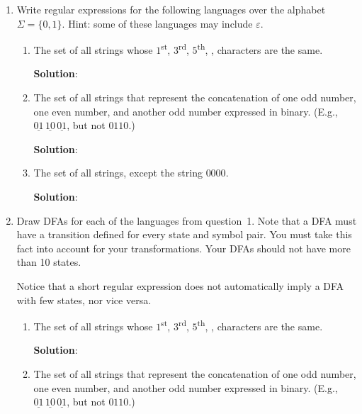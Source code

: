 \documentclass[11pt]{article}
\renewcommand{\epsilon}{\varepsilon}
\begin{document}
\begin{enumerate}
\item Write regular expressions for the following languages over the alphabet $\Sigma = \{0, 1\}$.  Hint: some of these languages may include $\epsilon$.
\begin{enumerate}
    \item The set of all strings whose $1$\textsuperscript{st}, $3$\textsuperscript{rd}, $5$\textsuperscript{th}, \textellipsis, characters are the same.

    \textbf{Solution}:
    \[
    \]

    \item The set of all strings that represent the concatenation of one odd number, one even number, and another odd number expressed in binary. (E.g., $\underline{01}\,\underline{10}\,\underline{01}$, but not $0110$.)

    \textbf{Solution}:
    \[
    \]

    \item The set of all strings, except the string $0000$.

    \textbf{Solution}:
    \[
    \]
\end{enumerate}

\newpage

\item Draw DFAs for each of the languages from question~1. Note that a DFA must have a transition defined for every state and symbol pair. You must take this fact into account for your transformations. Your DFAs should not have more than 10 states.

Notice that a short regular expression does not automatically imply a DFA with few states, nor vice versa.

\begin{enumerate}
    \item The set of all strings whose $1$\textsuperscript{st}, $3$\textsuperscript{rd}, $5$\textsuperscript{th}, \textellipsis, characters are the same.

        \textbf{Solution}:

    \item The set of all strings that represent the concatenation of one odd number, one even number, and another odd number expressed in binary. (E.g., $\underline{01}\,\underline{10}\,\underline{01}$, but not $0110$.)


\end{enumerate}
\end{enumerate}
\end{document}
